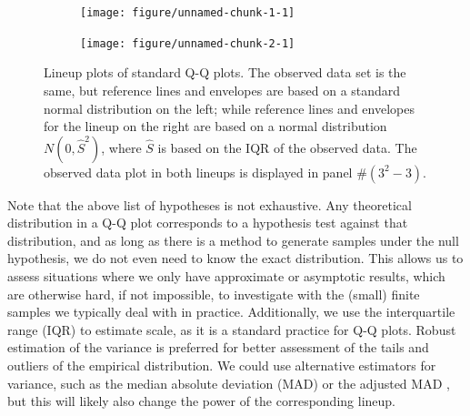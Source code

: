 \documentclass[12pt]{article}\usepackage[]{graphicx}\usepackage[]{color}
\newenvironment{knitrout}{}{} %
\newcommand{\alnote}[1]{\todo[inline,color=green!40]{#1}}
\newcommand{\hhnote}[1]{\todo[inline,color=magenta!40]{#1}}
\begin{document}
\begin{figure}[hbt]

\begin{subfigure}{0.5\textwidth}
\begin{knitrout}
\color{fgcolor}
\texttt{[image: figure/unnamed-chunk-1-1]} 

\end{knitrout}
\end{subfigure}
\begin{subfigure}{0.5\textwidth}
\begin{knitrout}
\color{fgcolor}
\texttt{[image: figure/unnamed-chunk-2-1]} 

\end{knitrout}
\end{subfigure}
\caption{\label{fig:lps} Lineup plots of standard Q-Q plots. The observed data set is the same, but  reference lines and envelopes are based on a standard normal distribution on the left; while  reference lines and envelopes for the lineup on the right are based on a normal distribution $N(0, \widehat{S}^2)$, where $\widehat{S}$ is based on the IQR of the observed data.
The observed data plot in both lineups is displayed in panel \#$(3^2 - 3)$. }
\end{figure}
\afterpage{\clearpage}

Note that the above list of hypotheses is not exhaustive. Any theoretical distribution in a Q-Q plot corresponds to a  hypothesis test against that distribution, and as long as there is a method to generate samples under the null hypothesis, we do not even need to know the exact distribution. This allows us to assess situations where we only have approximate or asymptotic results, which are otherwise hard, if not impossible, to investigate  with the (small) finite samples we typically deal with in practice.
Additionally, we use the interquartile range (IQR) to estimate scale, as it is a standard practice for Q-Q plots.
% 
% 
Robust estimation of the variance is preferred for better assessment of the tails and outliers of the empirical distribution. We could use alternative estimators for variance, such as the median absolute deviation (MAD) or the adjusted MAD \citep{rousseeuw}, but this will likely also change the power of the corresponding lineup.
\end{document}
